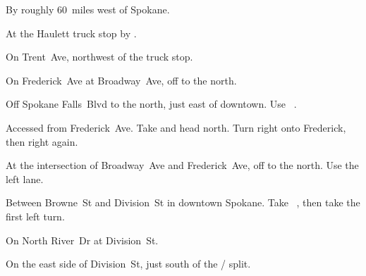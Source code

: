 
\begin{LocationList}

By  roughly 60~miles west of Spokane. %

At the Haulett truck stop by  .

\Location{\GarageHQ \Garage}
On Trent~Ave, northwest of the truck stop.

On Frederick~Ave at Broadway~Ave, off   to the north.

Off Spokane Falls~Blvd to the north, just east of downtown.
Use~ .

Accessed from Frederick~Ave.
Take   and head north.
Turn right onto Frederick, then right again.

At the intersection of Broadway~Ave and Frederick~Ave, off   to the north.
Use the left lane.

Between Browne~St and Division~St in downtown Spokane.
Take~ , then take the first left turn.

On North River~Dr at   Division~St.

On the east side of Division~St, just south of the  /  split.

\end{LocationList}
